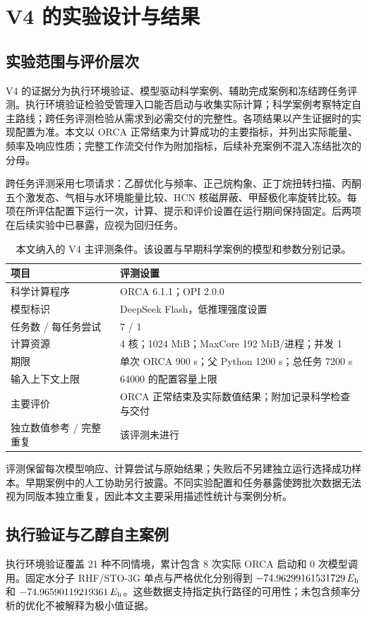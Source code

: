 \section{V4 的实验设计与结果}
\label{sec:v4-eval}
\subsection{实验范围与评价层次}
V4 的证据分为执行环境验证、模型驱动科学案例、辅助完成案例和冻结跨任务评测。执行环境验证检验受管理入口能否启动与收集实际计算；科学案例考察特定自主路线；跨任务评测检验从需求到必需交付的完整性。各项结果以产生证据时的实现配置为准。本文以 ORCA 正常结束为计算成功的主要指标，并列出实际能量、频率及响应性质；完整工作流交付作为附加指标，后续补充案例不混入冻结批次的分母。

跨任务评测采用七项请求：乙醇优化与频率、正己烷构象、正丁烷扭转扫描、丙酮五个激发态、气相与水环境能量比较、HCN 核磁屏蔽、甲醛极化率旋转比较。每项在所评估配置下运行一次，计算、提示和评价设置在运行期间保持固定。后两项在后续实验中已暴露，应视为回归任务。

\begin{table}[htbp]
\centering\small
\caption{本文纳入的 V4 主评测条件。该设置与早期科学案例的模型和参数分别记录。}
\label{tab:v4-settings}
\begin{tabularx}{\linewidth}{p{4.4cm}Y}
\toprule
项目 & 评测设置\\
\midrule
科学计算程序 & ORCA 6.1.1；OPI 2.0.0\\
模型标识 & DeepSeek Flash，低推理强度设置\\
任务数 / 每任务尝试 & 7 / 1\\
计算资源 & 4 核；1024 MiB；MaxCore 192 MiB/进程；并发 1\\
期限 & 单次 ORCA 900 s；父 Python 1200 s；总任务 7200 s\\
输入上下文上限 & 64000 的配置容量上限\\
主要评价 & ORCA 正常结束及实际数值结果；附加记录科学检查与交付\\
独立数值参考 / 完整重复 & 该评测未进行\\
\bottomrule
\end{tabularx}
\end{table}

评测保留每次模型响应、计算尝试与原始结果；失败后不另建独立运行选择成功样本。早期案例中的人工协助另行披露。不同实验配置和任务暴露使跨批次数据无法视为同版本独立重复，因此本文主要采用描述性统计与案例分析。

\subsection{执行验证与乙醇自主案例}
执行环境验证覆盖 21 种不同情境，累计包含 8 次实际 ORCA 启动和 0 次模型调用。固定水分子 RHF/STO-3G 单点与严格优化分别得到 $-74.96299161531729\,E_{\mathrm h}$ 和 $-74.96590119219361\,E_{\mathrm h}$。这些数据支持指定执行路径的可用性；未包含频率分析的优化不被解释为极小值证据。

